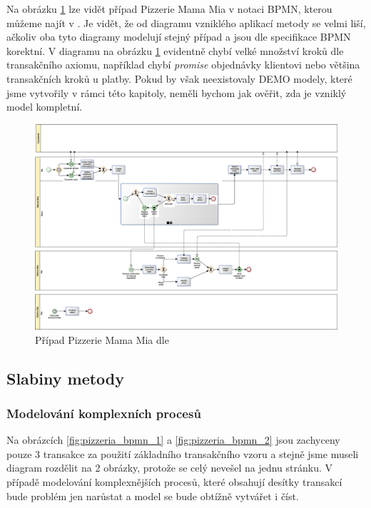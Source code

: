 Na obrázku \ref{fig:pizzeria_bpmn_old} lze vidět případ Pizzerie Mama Mia v notaci BPMN, kterou můžeme najít v \cite{VanNuffel2009}. Je vidět, že od diagramu vzniklého aplikací metody se velmi liší, ačkoliv oba tyto diagramy modelují stejný případ a jsou dle specifikace BPMN korektní. V diagramu na obrázku \ref{fig:pizzeria_bpmn_old} evidentně chybí velké množství kroků dle transakčního axiomu, například chybí \textit{promise} objednávky klientovi nebo většina transakčních kroků u platby. Pokud by však neexistovaly DEMO modely, které jsme vytvořily v rámci této kapitoly, neměli bychom jak ověřit, zda je vzniklý model kompletní.


\begin{landscape}
\begin{figure}[htbp]
\centerline{\includegraphics[scale=0.3]{obrazky/bpmn-pizzeria-old}}
\caption{Případ Pizzerie Mama Mia dle \cite{VanNuffel2009}}
\label{fig:pizzeria_bpmn_old}
\end{figure}
\end{landscape}

\subsection{Slabiny metody}
\subsubsection{Modelování komplexních procesů}
Na obrázcích \ref{fig:pizzeria_bpmn_1} a \ref{fig:pizzeria_bpmn_2} jsou zachyceny pouze 3 transakce za použití základního transakčního vzoru a stejně jsme museli diagram rozdělit na 2 obrázky, protože se celý nevešel na jednu stránku. V případě modelování komplexnějších procesů, které obsahují desítky transakcí bude problém jen narůstat a model se bude obtížně vytvářet i číst.

